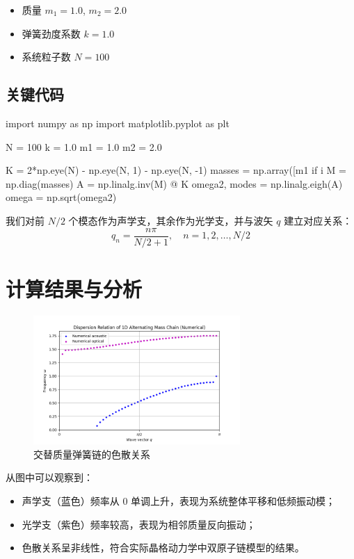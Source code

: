 \documentclass[12pt]{article}
\begin{document}
\begin{itemize}
  \item 质量 $m_1 = 1.0$, $m_2 = 2.0$
  \item 弹簧劲度系数 $k = 1.0$
  \item 系统粒子数 $N = 100$
\end{itemize}

\subsection*{关键代码}

\begin{python}
import numpy as np
import matplotlib.pyplot as plt

N = 100
k = 1.0
m1 = 1.0
m2 = 2.0

K = 2*np.eye(N) - np.eye(N, 1) - np.eye(N, -1)
masses = np.array([m1 if i %
M = np.diag(masses)
A = np.linalg.inv(M) @ K
omega2, modes = np.linalg.eigh(A)
omega = np.sqrt(omega2)
\end{python}

我们对前 $N/2$ 个模态作为声学支，其余作为光学支，并与波矢 $q$ 建立对应关系：
\[
q_n = \frac{n\pi}{N/2 + 1}, \quad n = 1,2,\dots,N/2
\]

\section{计算结果与分析}

\begin{figure}[H]
    \centering
    \includegraphics[width=0.7\textwidth]{dispersion.png}
    \caption{交替质量弹簧链的色散关系}
\end{figure}

从图中可以观察到：

\begin{itemize}
    \item 声学支（蓝色）频率从 0 单调上升，表现为系统整体平移和低频振动模；
    \item 光学支（紫色）频率较高，表现为相邻质量反向振动；
    \item 色散关系呈非线性，符合实际晶格动力学中双原子链模型的结果。
\end{itemize}
\end{document}
